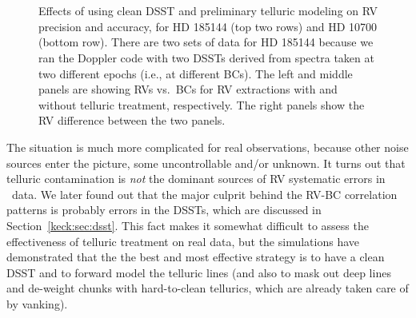 \begin{figure}
\\
\\
\caption{Effects of using clean DSST and preliminary telluric modeling
  on RV precision and accuracy, for HD 185144 (top two rows) and HD
  10700 (bottom row). There are two sets of data for HD 185144 because
  we ran the Doppler code with two DSSTs derived from spectra taken at
  two different epochs (i.e., at different BCs). The left and middle
  panels are showing RVs vs.\ BCs for RV extractions with and without
  telluric treatment, respectively. The right panels show the RV
  difference between the two panels.
\label{fig:real}}
\end{figure}


The situation is much more complicated for real observations, because
other noise sources enter the picture, some uncontrollable and/or
unknown. It turns out that telluric contamination is {\em not} the
dominant sources of RV systematic errors in \keck\ data. We later
found out that the major culprit behind the RV-BC correlation patterns
is probably errors in the DSSTs, which are discussed in
Section~\ref{keck:sec:dsst}. This fact makes it somewhat difficult to
assess the effectiveness of telluric treatment on real data, but the
simulations have demonstrated that the the best and most effective strategy
is to have a clean DSST and to forward model the telluric lines (and
also to mask out deep lines and de-weight chunks with hard-to-clean
tellurics, which are already taken care of by vanking).

